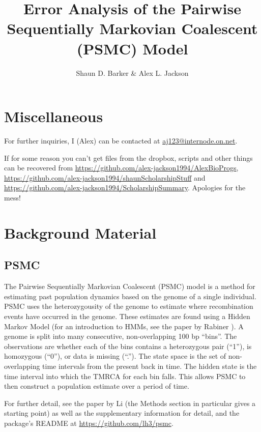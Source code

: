 \documentclass[11pt,a4paper]{article}
\title{Error Analysis of the Pairwise Sequentially Markovian Coalescent (PSMC) Model}
\author{Shaun D. Barker & Alex L. Jackson}
\begin{document}
\maketitle

%
\section{Miscellaneous}
For further inquiries, I (Alex) can be contacted at \href{mailto:aj123@internode.on.net}{aj123@internode.on.net}.

If for some reason you can't get files from the dropbox, scripts and other things can be recovered from \url{https://github.com/alex-jackson1994/AlexBioProgs}, \url{https://github.com/alex-jackson1994/shaunScholarshipStuff} and \url{https://github.com/alex-jackson1994/ScholarshipSummary}. Apologies for the mess!

\section{Background Material}
\subsection{PSMC}
The Pairwise Sequentially Markovian Coalescent (PSMC) model \cite{li2011inference} is a method for estimating past population dynamics based on the  genome of a single individual. PSMC uses the heterozygousity of the genome to estimate where recombination events have occurred in the genome. These estimates are found using a Hidden Markov Model (for an introduction to HMMs, see the paper by Rabiner \cite{rabiner1989tutorial}). A genome is split into many consecutive, non-overlapping 100 bp ``bins''. The observations are whether each of the bins contains a heterozygous pair (``1''), is homozygous (``0''), or data is missing (``.''). The state space is the set of non-overlapping time intervals from the present back in time. The hidden state is the time interval into which the TMRCA for each bin falls. This allows PSMC to then construct a population estimate over a period of time. 

For further detail, see the paper by Li \cite{li2011inference} (the Methods section in particular gives a starting point) as well as the supplementary information for detail, and the package's README at \url{https://github.com/lh3/psmc}.
\end{document}
